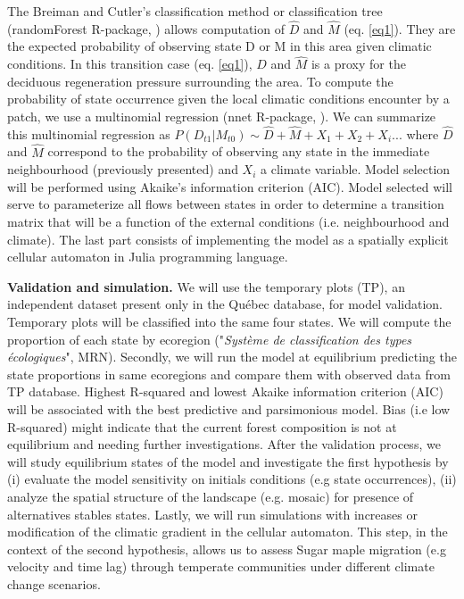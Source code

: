 The Breiman and Cutler's classification method or classification tree
(randomForest R-package, \cite{Liaw2002a}) allows computation of $\hat{D}$ and
$\hat{M}$ (eq. \ref{eq1}). They are the expected probability of observing
state D or M in this area given climatic conditions. In this transition case
(eq. \ref{eq1}), $\hat{D}$ and $\hat{M}$ is a proxy for the deciduous
regeneration pressure surrounding the area. To compute the probability of
state occurrence given the local climatic conditions encounter by a patch, we
use a multinomial regression (nnet R-package, \cite{Venables2002}). We can
summarize this multinomial regression as $P(D_{t1}|M_{t0}) \sim \hat{D} +
\hat{M} + X_1+X_2+X_i... $ where $\hat{D}$ and $\hat{M}$ correspond to the
probability of observing any state in the immediate neighbourhood (previously
presented) and $X_i$ a climate variable. Model selection will be performed
using Akaike's information criterion (AIC). Model selected will serve to
parameterize all flows between states in order to determine a transition
matrix that will be a function of the external conditions (i.e. neighbourhood
and climate). The last part consists of implementing the model as a spatially
explicit cellular automaton in Julia programming language.





\textbf{Validation and simulation.} We will use the temporary plots (TP), an
independent  dataset present only in the Québec database, for model
validation. Temporary plots will be classified into the same four states. We
will compute the proportion of each state by ecoregion ("\textit{Système de
classification des types écologiques}", MRN). Secondly, we will run the model
at equilibrium predicting the state proportions in same ecoregions and compare
them with observed data from TP database. Highest R-squared and lowest Akaike
information criterion (AIC) will be associated with the best predictive and
parsimonious model. Bias (i.e low R-squared) might indicate that the current
forest composition is not at equilibrium and needing further investigations.
After the validation process, we will study equilibrium states of the model
and investigate the first hypothesis by (i) evaluate the model sensitivity on
initials conditions (e.g state occurrences), (ii) analyze the spatial
structure of the landscape (e.g. mosaic) for presence of alternatives stables
states. Lastly, we will run simulations with increases or modification of the
climatic gradient in the cellular automaton. This step, in the context of the
second hypothesis, allows us to assess Sugar maple migration (e.g velocity and
time lag) through  temperate communities under different climate change
scenarios.


\clearpage
\small

